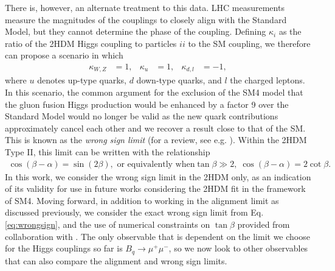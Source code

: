 \documentclass[a4paper,12pt]{article}
\begin{document}
There is, however, an alternate treatment to this data. 
LHC measurements measure the magnitudes of the couplings to closely align with the Standard Model, but they cannot determine the phase of the coupling. 
Defining $\kappa_i$ as the ratio of the 2HDM Higgs coupling to particles $ii$ to the SM coupling, we therefore can propose a scenario in which 
\begin{align}
    \kappa_{W,Z} &= 1, & \kappa_u &= 1, & \kappa_{d,l} &= -1,
\end{align}
where $u$ denotes up-type quarks, $d$ down-type quarks, and $l$ the charged leptons.
In this scenario, the common argument for the exclusion of the SM4 model that the gluon fusion Higgs production would be enhanced by a factor 9 over the Standard Model would no longer be valid as the new quark contributions approximately cancel each other and we recover a result close to that of the SM.
This is known as the \emph{wrong sign limit} (for a review, see e.g. \cite{wrong1,wrong2}).
Within the 2HDM Type II, this limit can be written with the relationship
\begin{align}
    \label{eq:wrongsign}
    \cos(\beta-\alpha) = \sin(2\beta), \text{ or equivalently when} \tan\beta\gg2,\; \cos(\beta-\alpha) = 2\cot\beta.
\end{align}
In this work, we consider the wrong sign limit in the 2HDM only, as an indication of its validity for use in future works considering the 2HDM fit in the framework of SM4. 
Moving forward, in addition to working in the alignment limit as discussed previously, we consider the exact wrong sign limit from Eq. \ref{eq:wrongsign}, and the use of numerical constraints on $\tan\beta$ provided from collaboration with \cite{oliver}.
The only observable that is dependent on the limit we choose for the Higgs couplings so far is $B_q\to\mu^+\mu^-$, so we now look to other observables that can also compare the alignment and wrong sign limits.
\end{document}
